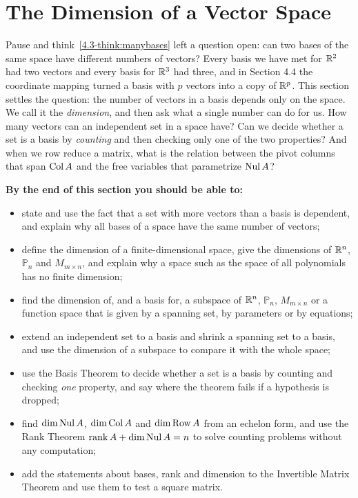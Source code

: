 \documentclass[11pt]{article}
\begin{document}
\section{The Dimension of a Vector Space}

\begin{guide}
Pause and think~\ref{4.3-think:manybases} left a question open: can two bases of the same space have different numbers of vectors? Every basis we have met for $\mathbb{R}^2$ had two vectors and every basis for $\mathbb{R}^3$ had three, and in Section 4.4 the coordinate mapping turned a basis with $p$ vectors into a copy of $\mathbb{R}^p$. This section settles the question: the number of vectors in a basis depends only on the space. We call it the \emph{dimension}, and then ask what a single number can do for us. How many vectors can an independent set in a space have? Can we decide whether a set is a basis by \emph{counting} and then checking only one of the two properties? And when we row reduce a matrix, what is the relation between the pivot columns that span $\operatorname{Col} A$ and the free variables that parametrize $\operatorname{Nul} A$?
\end{guide}

\textbf{By the end of this section you should be able to:}
\begin{itemize}
  \item state and use the fact that a set with more vectors than a basis is dependent, and explain why all bases of a space have the same number of vectors;
  \item define the dimension of a finite-dimensional space, give the dimensions of $\mathbb{R}^n$, $\mathbb{P}_n$ and $M_{m\times n}$, and explain why a space such as the space of all polynomials has no finite dimension;
  \item find the dimension of, and a basis for, a subspace of $\mathbb{R}^n$, $\mathbb{P}_n$, $M_{m\times n}$ or a function space that is given by a spanning set, by parameters or by equations;
  \item extend an independent set to a basis and shrink a spanning set to a basis, and use the dimension of a subspace to compare it with the whole space;
  \item use the Basis Theorem to decide whether a set is a basis by counting and checking \emph{one} property, and say where the theorem fails if a hypothesis is dropped;
  \item find $\dim\operatorname{Nul} A$, $\dim\operatorname{Col} A$ and $\dim\operatorname{Row} A$ from an echelon form, and use the Rank Theorem $\operatorname{rank} A+\dim\operatorname{Nul} A=n$ to solve counting problems without any computation;
  \item add the statements about bases, rank and dimension to the Invertible Matrix Theorem and use them to test a square matrix.
\end{itemize}
\end{document}
